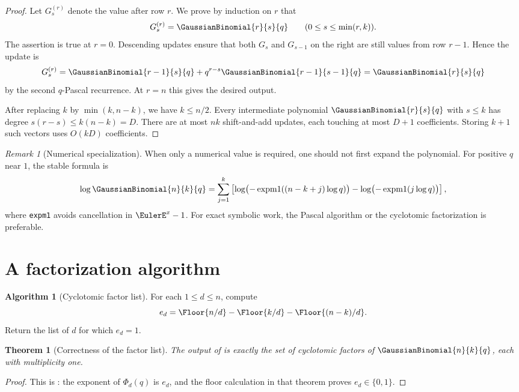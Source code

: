 \documentclass[11pt,a4paper,oneside,openany]{book}
\newtheorem{theorem}{Theorem}[chapter]
\theoremstyle{definition}
\newtheorem{algorithm}[algorithm]{Algorithm}
\theoremstyle{remark}
\newtheorem{remark}[remark]{Remark}
\begin{document}
\begin{proof}
Let $G_s^{(r)}$ denote the value after row $r$.  We prove by induction on $r$ that
\[
 G_s^{(r)}=\GaussianBinomial{r}{s}{q}
 \qquad(0\le s\le\min(r,k)).
\]
The assertion is true at $r=0$.  Descending updates ensure that both $G_s$ and $G_{s-1}$ on the right are still values from row $r-1$.  Hence the update is
\[
 G_s^{(r)}
 =\GaussianBinomial{r-1}{s}{q}+q^{r-s}\GaussianBinomial{r-1}{s-1}{q}
 =\GaussianBinomial{r}{s}{q}
\]
by the second $q$-Pascal recurrence.  At $r=n$ this gives the desired output.

After replacing $k$ by $\min(k,n-k)$, we have $k\le n/2$.  Every intermediate polynomial $\GaussianBinomial{r}{s}{q}$ with $s\le k$ has degree $s(r-s)\le k(n-k)=D$.  There are at most $nk$ shift-and-add updates, each touching at most $D+1$ coefficients.  Storing $k+1$ such vectors uses $O(kD)$ coefficients.
\end{proof}

\begin{remark}[Numerical specialization]
When only a numerical value is required, one should not first expand the polynomial.  For positive $q$ near $1$, the stable formula is
\[
 \log\GaussianBinomial{n}{k}{q}
 =\sum_{j=1}^{k}
 \left[\log\bigl(-\operatorname{expm1}((n-k+j)\log q)\bigr)
      -\log\bigl(-\operatorname{expm1}(j\log q)\bigr)\right],
\]
where \texttt{expm1} avoids cancellation in $\EulerE^x-1$.  For exact symbolic work, the Pascal algorithm or the cyclotomic factorization is preferable.
\end{remark}

\section{A factorization algorithm}

\begin{algorithm}[Cyclotomic factor list]\label{alg:cyclotomic-list}
For each $1\le d\le n$, compute
\[
 e_d=\Floor{n/d}-\Floor{k/d}-\Floor{(n-k)/d}.
\]
Return the list of $d$ for which $e_d=1$.
\end{algorithm}

\begin{theorem}[Correctness of the factor list]\label{thm:cyclotomic-list-correct}
The output of  is exactly the set of cyclotomic factors of $\GaussianBinomial{n}{k}{q}$, each with multiplicity one.
\end{theorem}

\begin{proof}
This is : the exponent of $\Phi_d(q)$ is $e_d$, and the floor calculation in that theorem proves $e_d\in\{0,1\}$.
\end{proof}
\end{document}

